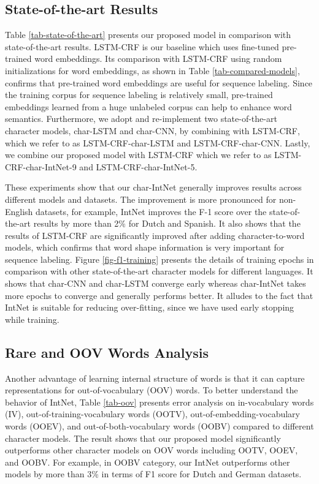 \documentclass[11pt,a4paper]{article}
\begin{document}
\subsection{State-of-the-art Results}

Table \ref{tab-state-of-the-art} presents our proposed model in comparison with state-of-the-art results. LSTM-CRF is our baseline which uses fine-tuned pre-trained word embeddings. Its comparison with LSTM-CRF using random initializations for word embeddings, as shown in Table \ref{tab-compared-models}, confirms that pre-trained word embeddings are useful for sequence labeling. Since the training corpus for sequence labeling is relatively small, pre-trained embeddings learned from a huge unlabeled corpus can help to enhance word semantics. Furthermore, we adopt and re-implement two state-of-the-art character models, char-LSTM and char-CNN, by combining with LSTM-CRF, which we refer to as LSTM-CRF-char-LSTM and LSTM-CRF-char-CNN. Lastly, we combine our proposed model with LSTM-CRF which we refer to as LSTM-CRF-char-IntNet-9 and LSTM-CRF-char-IntNet-5. 

These experiments show that our char-IntNet generally improves results across different models and datasets. The improvement is more pronounced for non-English datasets, for example, IntNet improves the F-1 score over the state-of-the-art results by more than 2\% for Dutch and Spanish. It also shows that the results of LSTM-CRF are significantly improved after adding character-to-word models, which confirms that word shape information is very important for sequence labeling. Figure \ref{fig-f1-training} presents the details of training epochs in comparison with other state-of-the-art character models for different languages. It shows that char-CNN and char-LSTM converge early whereas char-IntNet takes more epochs to converge and generally performs better. It alludes to the fact that IntNet is suitable for reducing over-fitting,  since we have used early stopping while training.


\subsection{Rare and OOV Words Analysis}
\label{sec:oov} 

Another advantage of learning internal structure of words is that it can capture representations for out-of-vocabulary (OOV) words. To better understand the behavior of IntNet, Table \ref{tab-oov} presents error analysis on in-vocabulary words (IV), out-of-training-vocabulary words (OOTV), out-of-embedding-vocabulary words (OOEV), and out-of-both-vocabulary words (OOBV) compared to different character models. The result shows that our proposed model significantly outperforms other character models on OOV words including OOTV, OOEV, and OOBV. For example, in OOBV category, our IntNet outperforms other models by more than 3\% in terms of F1 score for Dutch and German datasets.
\end{document}
